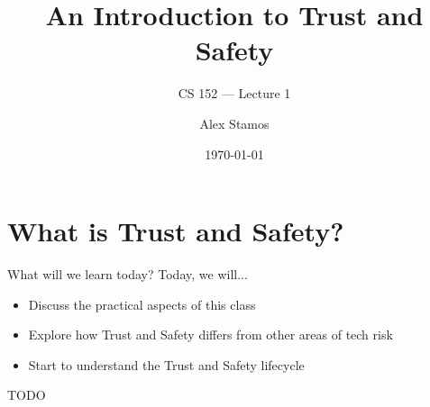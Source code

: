 \documentclass[nobackground,dvipsnames,table]{beamer}
\title{An Introduction to Trust and Safety}
\subtitle{CS 152 --- Lecture 1}
\author[A. Stamos]{Alex Stamos}
\institute[SIO]{\large Stanford Internet Observatory}
\date[2022]{\today}
\begin{document}
\begin{frame}
    \titlepage
\end{frame}

\section{What is Trust and Safety?}

\begin{frame}{What will we learn today?}
    Today, we will...
    \begin{itemize}
        \item Discuss the practical aspects of this class
        \item Explore how Trust and Safety differs from other areas of tech risk
        \item Start to understand the Trust and Safety lifecycle
    \end{itemize}
\end{frame}

\begin{frame}{TODO}
\end{frame}
\end{document}
